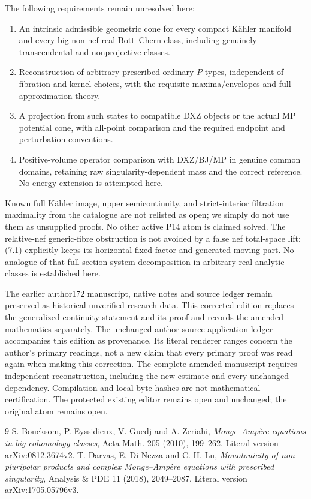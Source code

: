 \documentclass[11pt]{article}
\theoremstyle{remark}\newtheorem{remark}[theorem]{Remark}
\begin{document}
The following requirements remain unresolved here:
\begin{enumerate}
\item An intrinsic admissible geometric cone for every compact
K\"ahler manifold and every big non-nef real Bott--Chern class,
including genuinely transcendental and nonprojective classes.
\item Reconstruction of arbitrary prescribed ordinary $P$-types,
independent of fibration and kernel choices, with the requisite
maxima/envelopes and full approximation theory.
\item A projection from such states to compatible DXZ objects or
the actual MP potential cone, with all-point comparison and the
required endpoint and perturbation conventions.
\item Positive-volume operator comparison with DXZ/BJ/MP in
genuine common domains, retaining raw singularity-dependent mass
and the correct reference. No energy extension is attempted here.
\end{enumerate}
Known full K\"ahler image, upper semicontinuity, and strict-interior
filtration maximality from the catalogue are not relisted as open;
we simply do not use them as unsupplied proofs. No other active
P14 atom is claimed solved.
The relative-nef generic-fibre obstruction is not avoided by a
false nef total-space lift: (7.1) explicitly keeps its horizontal
fixed factor and generated moving part. No analogue of that full
section-system decomposition in arbitrary real analytic classes
is established here.

The earlier author172 manuscript, native notes and source ledger
remain preserved as historical unverified research data. This
corrected edition replaces the generalized continuity statement
and its proof and records the amended mathematics separately.
The unchanged author source-application ledger accompanies this
edition as provenance. Its literal renderer ranges concern the
author's primary readings, not a new claim that every primary
proof was read again when making this correction.
The complete amended manuscript requires independent reconstruction,
including the new estimate and every unchanged dependency.
Compilation and local byte hashes are not mathematical certification.
The protected existing editor remains open and unchanged;
the original atom remains open.

\begin{thebibliography}{9}
 S. Boucksom, P. Eyssidieux, V. Guedj and A. Zeriahi,
\emph{Monge--Amp\`ere equations in big cohomology classes},
Acta Math. 205 (2010), 199--262.
Literal version \href{https://arxiv.org/pdf/0812.3674v2}{arXiv:0812.3674v2}.
 T. Darvas, E. Di Nezza and C. H. Lu,
\emph{Monotonicity of non-pluripolar products and complex
Monge--Amp\`ere equations with prescribed singularity},
Analysis \& PDE 11 (2018), 2049--2087.
Literal version \href{https://arxiv.org/pdf/1705.05796v3}{arXiv:1705.05796v3}.
\end{thebibliography}
\end{document}
